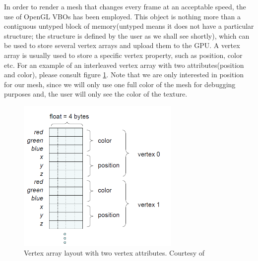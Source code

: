 \documentclass[]{article}
\begin{document}
In order to render a mesh that changes every frame at an acceptable speed, the use of OpenGL VBOs has been employed. This object is nothing more than a contiguous untyped block of memory(untyped means it does not have a particular structure; the structure is defined by the user as we shall see shortly), which can be used to store several vertex arrays and upload them to the GPU. A vertex array is usually used to store a specific vertex property, such as position, color etc. For an example of an interleaved vertex array with two attributes(position and color), please consult figure \ref{fig:VertexArrays}. Note that we are only interested in position for our mesh, since we will only use one full color of the mesh for debugging purposes and, the user will only see the color of the texture.

\begin{figure}[hbtp]
    \centering
    \includegraphics[width=0.7\textwidth]{figures/VertexArrays.PNG}
    \caption{Vertex array layout with two vertex attributes. Courtesy of \cite{kilgard2009}}
    \label{fig:VertexArrays}
\end{figure}
\end{document}
